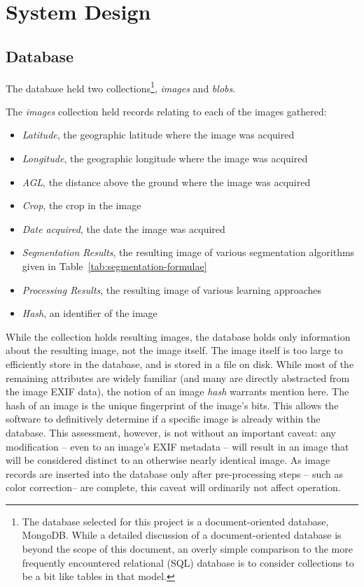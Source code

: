 \documentclass[letterpaper]{article}
\begin{document}
{\section{System Design}
\subsection{Database}
The database held two collections\footnote{The database selected for this project is a document-oriented database, MongoDB. While a detailed discussion of a document-oriented database is beyond the scope of this document, an overly simple comparison to the more frequently encountered relational (SQL) database is to consider collections to be a bit like tables in that model.}, \textit{images} and \textit{blobs}.

The \textit{images} collection held records relating to each of the images gathered:
\begin{itemize}
	\item{\textit{Latitude}, the geographic latitude where the image was acquired}
	\item{\textit{Longitude}, the geographic longitude where the image was acquired}
	\item{\textit{AGL}, the distance above the ground where the image was acquired}
	\item{\textit{Crop}, the crop in the image}
	\item{\textit{Date acquired}, the date the image was acquired}
	\item{\textit{Segmentation Results}, the resulting image of various segmentation algorithms given in Table~\ref{tab:segmentation-formulae}}	
	\item{\textit{Processing Results}, the resulting image of various learning approaches}	
	\item{\textit{Hash}, an identifier of the image}	
\end{itemize}
 While the collection holds resulting images, the database holds only information about the resulting image, not the image itself. The image itself is too large to efficiently store in the database, and is stored in a file on disk. While most of the remaining attributes are widely familiar (and many are directly abstracted from the image EXIF data), the notion of an image \textit{hash} warrants mention here. The hash of an image is the unique fingerprint of the image's bits. This allows the software to definitively determine if a specific image is already within the database. This assessment, however, is not without an important caveat: any modification -- even to an image's EXIF metadata -- will result in an image that will be considered distinct to an otherwise nearly identical image. As image records are inserted into the database only after pre-processing steps -- such as color correction-- are complete, this caveat will ordinarily not affect operation.
 
}
\end{document}
